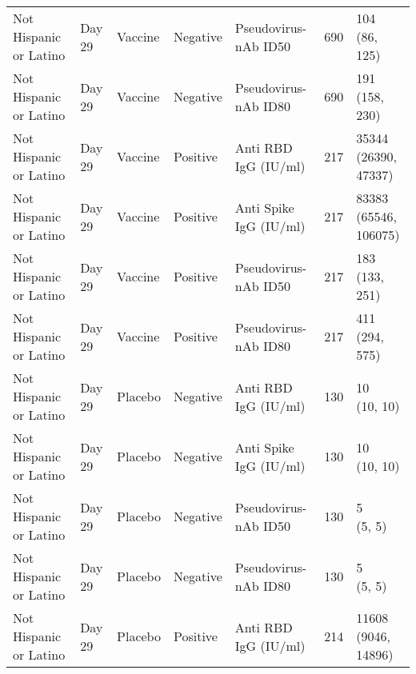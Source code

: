 \documentclass[]{book}
\theoremstyle{definition}
\theoremstyle{definition}
\theoremstyle{definition}
\newcommand{\1}{\mathbbm{1}}
\begin{document}
\begin{landscape}
\begin{ThreePartTable}
\begin{longtable}[t]{>{\raggedright\arraybackslash}p{7cm}llllll}
\hspace{1em}Not Hispanic or Latino & Day 29 & Vaccine & Negative & Pseudovirus-nAb ID50 & 690 & \makecell[l]{104\\(86, 125)}\\
\hspace{1em}Not Hispanic or Latino & Day 29 & Vaccine & Negative & Pseudovirus-nAb ID80 & 690 & \makecell[l]{191\\(158, 230)}\\
\hspace{1em}Not Hispanic or Latino & Day 29 & Vaccine & Positive & Anti RBD IgG (IU/ml) & 217 & \makecell[l]{35344\\(26390, 47337)}\\
\hspace{1em}Not Hispanic or Latino & Day 29 & Vaccine & Positive & Anti Spike IgG (IU/ml) & 217 & \makecell[l]{83383\\(65546, 106075)}\\
\hspace{1em}Not Hispanic or Latino & Day 29 & Vaccine & Positive & Pseudovirus-nAb ID50 & 217 & \makecell[l]{183\\(133, 251)}\\
\hspace{1em}Not Hispanic or Latino & Day 29 & Vaccine & Positive & Pseudovirus-nAb ID80 & 217 & \makecell[l]{411\\(294, 575)}\\
\hspace{1em}Not Hispanic or Latino & Day 29 & Placebo & Negative & Anti RBD IgG (IU/ml) & 130 & \makecell[l]{10\\(10, 10)}\\
\hspace{1em}Not Hispanic or Latino & Day 29 & Placebo & Negative & Anti Spike IgG (IU/ml) & 130 & \makecell[l]{10\\(10, 10)}\\
\hspace{1em}Not Hispanic or Latino & Day 29 & Placebo & Negative & Pseudovirus-nAb ID50 & 130 & \makecell[l]{5\\(5, 5)}\\
\hspace{1em}Not Hispanic or Latino & Day 29 & Placebo & Negative & Pseudovirus-nAb ID80 & 130 & \makecell[l]{5\\(5, 5)}\\
\hspace{1em}Not Hispanic or Latino & Day 29 & Placebo & Positive & Anti RBD IgG (IU/ml) & 214 & \makecell[l]{11608\\(9046, 14896)}\\

\end{longtable}
\end{ThreePartTable}
\end{landscape}
\end{document}
